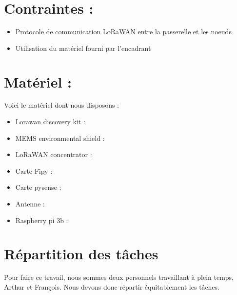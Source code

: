 \documentclass[letterpaper,10pt,french]{sphinxmanual}
\begin{document}
\chapter{Contraintes :}
\label{\detokenize{specifications:contraintes}}\begin{itemize}
\item {} 
Protocole de communication LoRaWAN entre la passerelle et les noeuds

\item {} 
Utilisation du matériel fourni par l’encadrant

\end{itemize}


\chapter{Matériel :}
\label{\detokenize{specifications:materiel}}
Voici le matériel dont nous disposons :
\begin{itemize}
\item {} 
Lorawan discovery kit : 

\item {} 
MEMS environmental shield : 

\item {} 
LoRaWAN concentrator : 

\item {} 
Carte Fipy : 

\item {} 
Carte pysense : 

\item {} 
Antenne : 

\item {} 
Raspberry pi 3b : 

\end{itemize}


\chapter{Répartition des tâches}
\label{\detokenize{repartitions:repartition-des-taches}}\label{\detokenize{repartitions::doc}}
Pour faire ce travail, nous sommes deux personnels travaillant à plein temps, Arthur et François.
Nous devons donc répartir équitablement les tâches.
\end{document}
